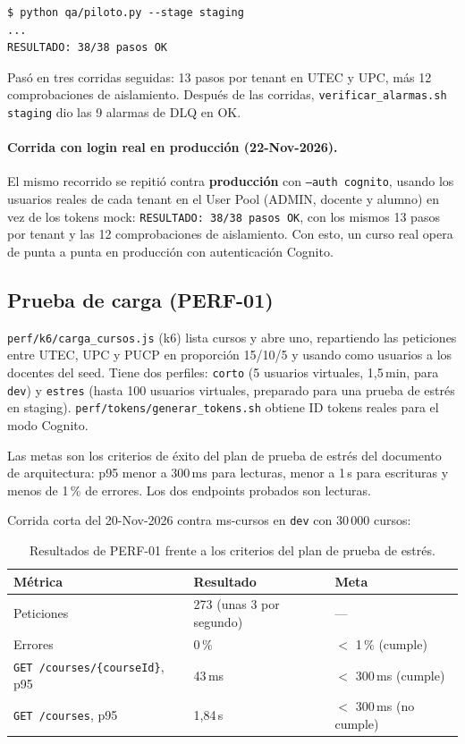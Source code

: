 \begin{lstlisting}
$ python qa/piloto.py --stage staging
...
RESULTADO: 38/38 pasos OK
\end{lstlisting}

Pasó en tres corridas seguidas: 13 pasos por tenant en UTEC y UPC, más 12 comprobaciones de aislamiento.
Después de las corridas, \texttt{verificar\_alarmas.sh staging} dio las 9 alarmas de DLQ en OK.

\paragraph{Corrida con login real en producción (22-Nov-2026).} El mismo recorrido se repitió contra
\textbf{producción} con \texttt{--auth cognito}, usando los usuarios reales de cada tenant en el User Pool
(ADMIN, docente y alumno) en vez de los tokens mock: \texttt{RESULTADO: 38/38 pasos OK}, con los mismos 13
pasos por tenant y las 12 comprobaciones de aislamiento. Con esto, un curso real opera de punta a punta en
producción con autenticación Cognito.

\subsection{Prueba de carga (PERF-01)}
\texttt{perf/k6/carga\_cursos.js} (k6) lista cursos y abre uno, repartiendo las peticiones entre
UTEC, UPC y PUCP en proporción 15/10/5 y usando como usuarios a los docentes del seed. Tiene dos
perfiles: \texttt{corto} (5 usuarios virtuales, 1{,}5\,min, para \texttt{dev}) y \texttt{estres}
(hasta 100 usuarios virtuales, preparado para una prueba de estrés en staging).
\texttt{perf/tokens/generar\_tokens.sh} obtiene ID tokens reales para el modo Cognito.

Las metas son los criterios de éxito del plan de prueba de estrés del documento de arquitectura:
p95 menor a 300\,ms para lecturas, menor a 1\,s para escrituras y menos de 1\,\% de errores. Los dos
endpoints probados son lecturas.

Corrida corta del 20-Nov-2026 contra ms-cursos en \texttt{dev} con 30\,000 cursos:

\begin{table}[htbp]
\centering\small
\begin{tabularx}{\textwidth}{Xll}
\toprule
Métrica & Resultado & Meta \\
\midrule
Peticiones & 273 (unas 3 por segundo) & --- \\
Errores & 0\,\% & $<$ 1\,\% (cumple) \\
\texttt{GET /courses/\{courseId\}}, p95 & 43\,ms & $<$ 300\,ms (cumple) \\
\texttt{GET /courses}, p95 & 1{,}84\,s & $<$ 300\,ms (no cumple) \\
\bottomrule
\end{tabularx}
\caption{Resultados de PERF-01 frente a los criterios del plan de prueba de estrés.}
\label{tab:perf01}
\end{table}

